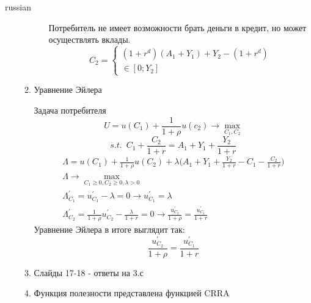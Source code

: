 \documentclass{article}
\begin{document}
\begin{otherlanguage*}{russian}
\begin{enumerate}
\begin{enumerate}
\begin{enumerate}
Потребитель не имеет возможности брать деньги в кредит, но может осуществлять вклады.  
\begin{equation}
C_2 = \begin{cases} 
(1 + r^d) (A_1 + Y_1) + Y_2 - (1 + r^d) \\
\in [0; Y_2] 
\end{cases}
\end{equation}
\end{enumerate}
\item Уравнение Эйлера

Задача потребителя
\begin{equation}
U = u(C_1) + \frac{1}{1 + \rho} u(c_2) \rightarrow \max_{C_1, C_2} 
\end{equation}
\begin{equation}
s.t. \,\,\, C_1 + \frac{C_2}{1 + r} = A_1 + Y_1 + \frac{Y_2}{1 + r}
\end{equation}
\begin{align}
\Lambda = u(C_1) + \frac{1}{1 + \rho} u(C_2) + \lambda \Big( A_1 + Y_1 + \frac{Y_2}{1 + r} - C_1 - \frac{C_2}{1 + r}\Big) \\ 
\Lambda \rightarrow \max_{C_1 \ge 0, C_2 \ge 0, \lambda > 0} \\
\Lambda^{'}_{C_1} = u^{'}_{C_1} - \lambda = 0 \rightarrow u^{'}_{C_1} = \lambda \\
\Lambda^{'}_{C_2} =\frac{1}{1 + \rho}  u^{'}_{C_2} - \frac{\lambda}{1 + r} = 0 \rightarrow \frac{u^{'}_{C_2}}{1 + \rho} = \frac{u^{'}_{C_1}}{1 + r} 
\end{align}
Уравнение Эйлера в итоге выглядит так: 
\begin{equation}
 \frac{u^{'}_{C_2}}{1 + \rho} = \frac{u^{'}_{C_1}}{1 + r} 
\end{equation}
\item Слайды 17-18 - ответы на 3.с
\item Функция полезности представлена функцией CRRA 


\end{enumerate}
\end{enumerate}
\end{otherlanguage*}
\end{document}
